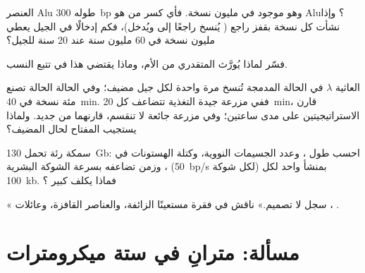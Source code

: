 \begin{exercise}[$\star\star$]\label{exo:b1:genomes:8}
العنصر Alu طوله \qty{300}{bp} وهو موجود في مليون نسخة. فأي كسر من
 هو Alu؟ وإذا نشأت كل نسخة بقفز راجع ( يُنسخ راجعًا إلى
 ويُدخل)، فكم إدخالًا في الجيل يعطي مليون نسخة في \num{60} مليون
سنة عند \num{20} سنة للجيل؟
\end{exercise}

\begin{exercise}[$\star\star$]\label{exo:b1:genomes:9}
فسّر لماذا يُورَّث  المتقدري من الأم، وماذا يقتضي هذا في
تتبع النسب.
\end{exercise}

\begin{exercise}[$\star\star\star$]\label{exo:b1:genomes:10}
العاثية $\lambda$ في الحالة المدمجة تُنسخ مرة واحدة لكل جيل مضيف؛ وفي
الحالة الحالة تصنع مئة نسخة في \qty{40}{min}. ففي مزرعة جيدة التغذية
تتضاعف كل \qty{20}{min}، قارن الاستراتيجيتين على مدى ساعتين؛ وفي
مزرعة جائعة لا تنقسم، قارنهما من جديد. ولماذا يستجيب المفتاح لحال
المضيف؟
\end{exercise}

\begin{exercise}[$\star\star\star$]\label{exo:b1:genomes:11}
 سمكة رئة تحمل \qty{130}{Gb}: احسب طول ، وعدد الجسيمات
النووية، وكتلة الهستونات في ، وزمن تضاعفه بسرعة الشوكة البشرية
(\qty{50}{bp/s} لكل شوكة) بمنشأ واحد لكل \qty{100}{kb}. فماذا يكلف
 كبير ؟
\end{exercise}

\begin{exercise}[$\star\star\star$]\label{exo:b1:genomes:12}
« سجل لا تصميم.» ناقش في فقرة مستعينًا  الزائفة،
والعناصر القافزة، وعائلات ، .
\end{exercise}

\section{مسألة: مترانِ في ستة ميكرومترات}

